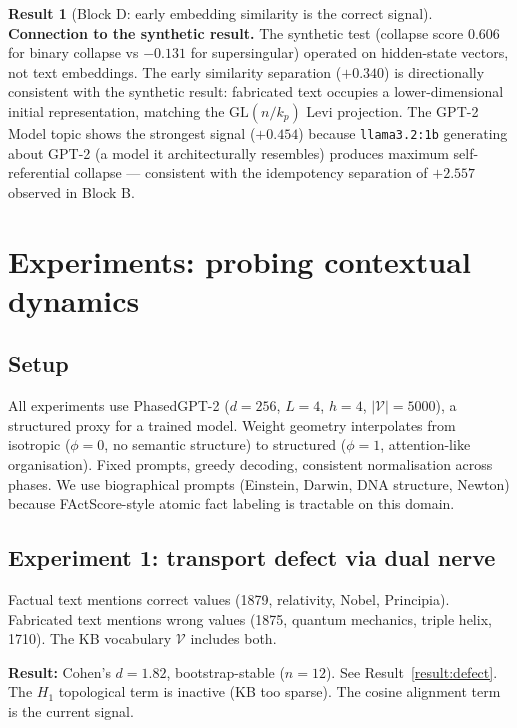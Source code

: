 \documentclass[11pt]{amsart}
\theoremstyle{definition}
\newtheorem{result}[theorem]{Result}
\begin{document}
\begin{result}[Block D: early embedding similarity is the correct signal]
\noindent\textbf{Connection to the synthetic result.}
The synthetic test (collapse score $0.606$ for binary collapse
vs $-0.131$ for supersingular) operated on hidden-state vectors,
not text embeddings.
The early similarity separation ($+0.340$) is directionally
consistent with the synthetic result: fabricated text occupies
a lower-dimensional initial representation, matching the
$\mathrm{GL}(n/k_p)$ Levi projection.
The GPT-2 Model topic shows the strongest signal ($+0.454$)
because \texttt{llama3.2:1b} generating about GPT-2
(a model it architecturally resembles) produces maximum
self-referential collapse --- consistent with the idempotency
separation of $+2.557$ observed in Block B.
\end{result}

\section{Experiments: probing contextual dynamics}
\label{sec:experiments}

\subsection{Setup}

All experiments use PhasedGPT-2 ($d=256$, $L=4$, $h=4$, $|\mathcal{V}|=5000$),
a structured proxy for a trained model.
Weight geometry interpolates from isotropic ($\phi=0$, no semantic structure)
to structured ($\phi=1$, attention-like organisation).
Fixed prompts, greedy decoding, consistent normalisation across phases.
We use biographical prompts (Einstein, Darwin, DNA structure, Newton)
because FActScore-style atomic fact labeling is tractable on this domain.

\subsection{Experiment 1: transport defect via dual nerve}

Factual text mentions correct values (1879, relativity, Nobel, Principia).
Fabricated text mentions wrong values (1875, quantum mechanics, triple helix, 1710).
The KB vocabulary $\mathcal{V}$ includes both.

\textbf{Result:} Cohen's $d = 1.82$, bootstrap-stable ($n=12$).
See Result~\ref{result:defect}.
The $H_1$ topological term is inactive (KB too sparse).
The cosine alignment term is the current signal.
\end{document}
